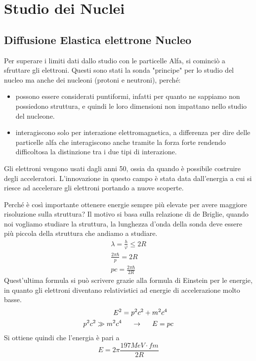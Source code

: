 \section{Studio dei Nuclei}
\subsection{Diffusione Elastica elettrone Nucleo}
Per superare i limiti dati dallo studio con le particelle Alfa, si cominciò a sfruttare gli elettroni.
Questi sono stati la sonda "principe" per lo studio del nucleo ma anche dei nucleoni (protoni e neutroni), perché:
\begin{itemize}
\item possono essere considerati puntiformi, infatti per quanto ne sappiamo non possiedono struttura, e quindi le loro dimensioni non impattano nello studio del nucleone.
\item interagiscono solo per interazione elettromagnetica, a differenza per dire delle particelle alfa che interagiscono anche tramite la forza forte rendendo difficoltosa la distinzione tra i due tipi di interazione.
\end{itemize}

Gli elettroni vengono usati dagli anni 50, ossia da quando è possibile costruire degli acceleratori.
L'innovazione in questo campo è stata data dall'energia a cui si riesce ad accelerare gli elettroni portando a nuove scoperte.

Perché è così importante ottenere energie sempre più elevate per avere maggiore risoluzione sulla struttura?
Il motivo si basa sulla relazione di de Briglie, quando noi vogliamo studiare la struttura, la lunghezza d'onda della sonda deve essere più piccola della struttura che andiamo a studiare.
\begin{equation}
\begin{split}
\lambda=\frac{h}{\varphi}\leq 2R\\
\frac{2\pi\hbar}{p}=2R\\
pc=\frac{2\pi\hbar}{2R}
\end{split}
\end{equation}
Quest'ultima formula si può scrivere grazie alla formula di Einstein per le energie, in quanto gli elettroni diventano relativistici ad energie di accelerazione molto basse.
\begin{equation}
\begin{split}
E^2 &=p^2c^2+m^2c^4\\
p^2c^2 \gg m^2c^4 &\hspace{0.5cm}\to\hspace{0.5cm}E=pc
\end{split}
\end{equation}
Si ottiene quindi che l'energia è pari a 
\begin{equation}
E=2\pi\frac{197MeV\cdot fm}{2R}
\end{equation}

